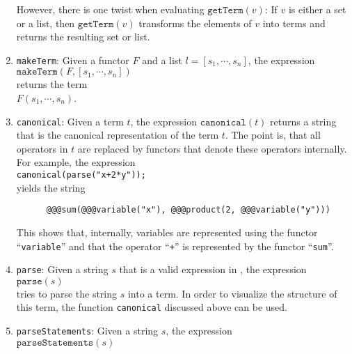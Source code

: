 \begin{enumerate}
      However, there is one twist when evaluating $\texttt{getTerm}(v)$: If $v$ is either a set or a list,
      then $\texttt{getTerm}(v)$ transforms the elements of $v$ into terms and returns the
      resulting set or list.  
\item \texttt{makeTerm}: Given a functor $F$ and a list $l = [s_1, \cdots, s_n]$,
      the expression
      \\[0.2cm]
      \hspace*{1.3cm}
      $\mathtt{makeTerm}(F, [s_1, \cdots, s_n])$
      \\[0.2cm]
      returns the term
      \\[0.2cm]
      \hspace*{1.3cm}
      $F(s_1, \cdots, s_n)$.
\item \texttt{canonical}:  Given a term $t$, the expression $\mathtt{canonical}(t)$
      returns a string that is the canonical representation of the term $t$.  The 
      point is, that all operators in $t$ are replaced by functors that denote
      these operators internally.  For example, the expression
      \\[0.2cm]
      \hspace*{1.3cm}
      \texttt{canonical(parse("x+2*y"));}
      \\[0.2cm]
      yields the string
\begin{verbatim}
      @@@sum(@@@variable("x"), @@@product(2, @@@variable("y")))
\end{verbatim}
      This shows that, internally, variables are represented using the functor
      ``\texttt{variable}'' and that the operator ``\texttt{+}'' is represented by
      the functor ``\texttt{sum}''.
\item \texttt{parse}:  Given a string $s$ that is a valid expression in \setlx, the expression
      \\[0.2cm]
      \hspace*{1.3cm}
      $\mathtt{parse}(s)$ 
      \\[0.2cm]
      tries to parse the string $s$ into a term.  In order to visualize the structure of
      this term,  the function \texttt{canonical} discussed above can be used.      
\item \texttt{parseStatements}:  Given a string $s$, the expression
      \\[0.2cm]
      \hspace*{1.3cm}
      $\mathtt{parseStatements}(s)$ 
      \\[0.2cm]

\end{enumerate}
